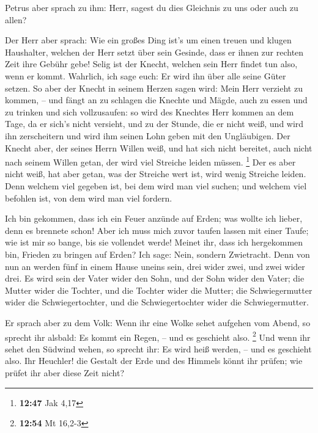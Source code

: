  Petrus aber sprach zu ihm: Herr, sagest du dies
Gleichnis zu uns oder auch zu allen?

 Der Herr aber sprach: Wie ein großes Ding ist's um einen
treuen und klugen Haushalter, welchen der Herr setzt über sein Gesinde,
dass er ihnen zur rechten Zeit ihre Gebühr gebe!  Selig
ist der Knecht, welchen sein Herr findet tun also, wenn er kommt.
 Wahrlich, ich sage euch: Er wird ihn über alle seine
Güter setzen.  So aber der Knecht in seinem Herzen sagen
wird: Mein Herr verzieht zu kommen, -- und fängt an zu schlagen die
Knechte und Mägde, auch zu essen und zu trinken und sich vollzusaufen:
 so wird des Knechtes Herr kommen an dem Tage, da er
sich's nicht versieht, und zu der Stunde, die er nicht weiß, und wird
ihn zerscheitern und wird ihm seinen Lohn geben mit den Ungläubigen.
 Der Knecht aber, der seines Herrn Willen weiß, und hat
sich nicht bereitet, auch nicht nach seinem Willen getan, der wird viel
Streiche leiden müssen. \footnote{\textbf{12:47} Jak 4,17}
 Der es aber nicht weiß, hat aber getan, was der Streiche
wert ist, wird wenig Streiche leiden. Denn welchem viel gegeben ist, bei
dem wird man viel suchen; und welchem viel befohlen ist, von dem wird
man viel fordern.

 Ich bin gekommen, dass ich ein Feuer anzünde auf Erden;
was wollte ich lieber, denn es brennete schon!  Aber ich
muss mich zuvor taufen lassen mit einer Taufe; wie ist mir so bange, bis
sie vollendet werde!  Meinet ihr, dass ich hergekommen
bin, Frieden zu bringen auf Erden? Ich sage: Nein, sondern Zwietracht.
 Denn von nun an werden fünf in einem Hause uneins sein,
drei wider zwei, und zwei wider drei.  Es wird sein der
Vater wider den Sohn, und der Sohn wider den Vater; die Mutter wider die
Tochter, und die Tochter wider die Mutter; die Schwiegermutter wider die
Schwiegertochter, und die Schwiegertochter wider die Schwiegermutter.

 Er sprach aber zu dem Volk: Wenn ihr eine Wolke sehet
aufgehen vom Abend, so sprecht ihr alsbald: Es kommt ein Regen, -- und
es geschieht also. \footnote{\textbf{12:54} Mt 16,2-3} 
Und wenn ihr sehet den Südwind wehen, so sprecht ihr: Es wird heiß
werden, -- und es geschieht also.  Ihr Heuchler! die
Gestalt der Erde und des Himmels könnt ihr prüfen; wie prüfet ihr aber
diese Zeit nicht?

